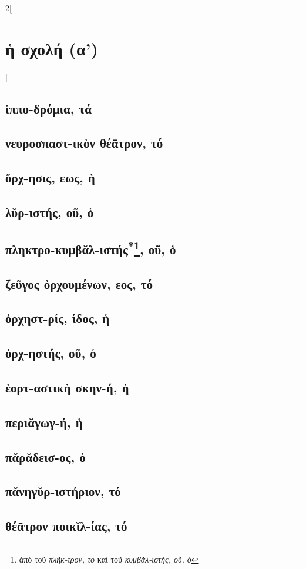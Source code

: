 \documentclass{book}
\begin{document}
\begin{multicols}{2}[\section{ἡ σχολή (α')}]
\subsection{ἱππο-δρόμια, τά}
\subsection{νευροσπαστ-ικὸν θέᾱτρον, τό}
\subsection{ὄρχ-ησις, εως, ἡ}
\subsection{λῠρ-ιστής, οῦ, ὁ}
\subsection{πληκτρο-κυμβᾰλ-ιστής\textsuperscript{*}\protect\footnote{ἀπὸ τοῦ \emph{πλῆκ-τρον, τό} καὶ τοῦ \emph{κυμβᾰλ-ιστής, οῦ, ὁ}}, οῦ, ὁ}
\subsection{ζεῦγος ὀρχουμένων, εος, τό}
 \subsection{ὀρχηστ-ρίς, ίδος, ἡ}
 \subsection{ὀρχ-ηστής, οῦ, ὁ}
 \subsection{ἑορτ-αστικὴ σκην-ή, ἡ}
 \subsection{περιᾰγωγ-ή, ἡ}
 \subsection{πᾰρᾰδεισ-ος, ὁ}
 \subsection{πᾰνηγῠρ-ιστήριον, τό}
 \subsection{θέᾱτρον ποικῐλ-ίας, τό}

\end{multicols}
\end{document}
